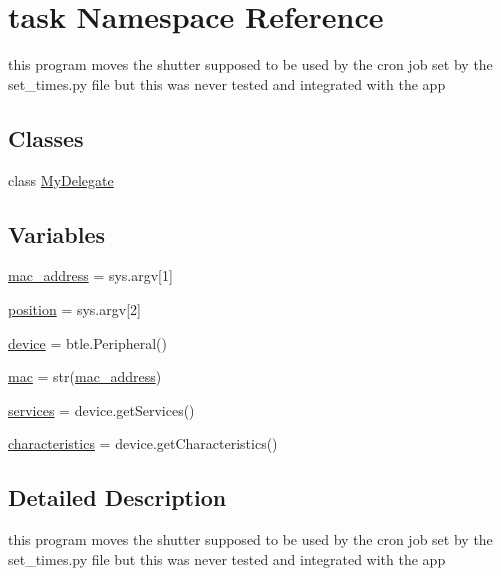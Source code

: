 \hypertarget{namespacetask}{}\section{task Namespace Reference}
\label{namespacetask}


this program moves the shutter supposed to be used by the cron job set by the set\+\_\+times.\+py file but this was never tested and integrated with the app  


\subsection*{Classes}
\begin{DoxyCompactItemize}
\item 
class \hyperlink{classtask_1_1MyDelegate}{My\+Delegate}
\end{DoxyCompactItemize}
\subsection*{Variables}
\begin{DoxyCompactItemize}
\item 
\hyperlink{namespacetask_a178a6511c8266d313ee6d314e5bf96dd}{mac\+\_\+address} = sys.\+argv\mbox{[}1\mbox{]}
\item 
\hyperlink{namespacetask_a98d48fce73867d3374ad234fd7f6f48c}{position} = sys.\+argv\mbox{[}2\mbox{]}
\item 
\hyperlink{namespacetask_a75e3efb7d8c413bc7f928bec6e72ec6e}{device} = btle.\+Peripheral()
\item 
\hyperlink{namespacetask_a1e9118d2b9afdf73e26df673192cd38f}{mac} = str(\hyperlink{namespacetask_a178a6511c8266d313ee6d314e5bf96dd}{mac\+\_\+address})
\item 
\hyperlink{namespacetask_a40a314326d8a939772cafc542b24a26e}{services} = device.\+get\+Services()
\item 
\hyperlink{namespacetask_a9c0131894acd916b23c9d507e5823a44}{characteristics} = device.\+get\+Characteristics()
\end{DoxyCompactItemize}


\subsection{Detailed Description}
this program moves the shutter supposed to be used by the cron job set by the set\+\_\+times.\+py file but this was never tested and integrated with the app 

